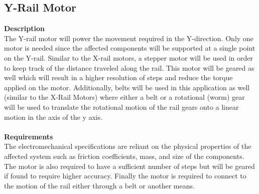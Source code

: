 \documentclass[titlepage]{article}
\begin{document}
\begin{center}
\begin{center}
\begin{center}
\begin{center}
\begin{center}
\begin{center}
\begin{center}
\begin{center}
\begin{center}
\begin{center}
\begin{center}
\begin{center}
\begin{center}
\begin{center}
\begin{center}
\begin{center}
\begin{center}
\begin{center}
\begin{center}
\begin{center}
\subsection{Y-Rail Motor}
\textbf{Description}\\
The Y-rail motor will power the movement required in the Y-direction. Only one motor is needed since the affected components will be supported at a single point on the Y-rail. Similar to the X-rail motors, a stepper motor will be used in order to keep track of the distance traveled along the rail. This motor will be geared as well which will result in a higher resolution of steps and reduce the torque applied on the motor. Additionally, belts will be used in this application as well (similar to the X-Rail Motors) where either a belt or a rotational (worm) gear will be used to translate the rotational motion of the rail gears onto a linear motion in the axis of the y axis.\\\\
\textbf{Requirements}\\
The electromechanical specifications are reliant on the physical properties of the affected system such as friction coefficients, mass, and size of the components. The motor is also required to have a sufficient number of steps but will be geared if found to require higher accuracy. Finally the motor is required to connect to the motion of the rail either through a belt or another means.


\end{center}
\end{center}
\end{center}
\end{center}
\end{center}
\end{center}
\end{center}
\end{center}
\end{center}
\end{center}
\end{center}
\end{center}
\end{center}
\end{center}
\end{center}
\end{center}
\end{center}
\end{center}
\end{center}
\end{center}
\end{document}
